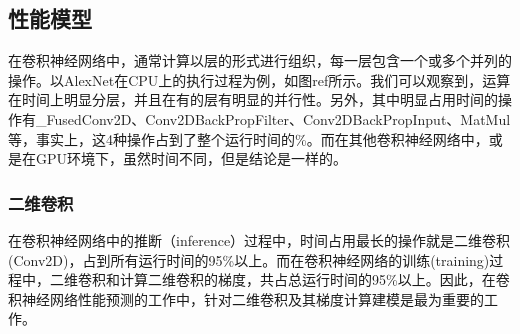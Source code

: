 \subsection{性能模型}
    在卷积神经网络中，通常计算以层的形式进行组织，每一层包含一个或多个并列的操作。以AlexNet在CPU上的执行过程为例，如图ref所示。我们可以观察到，运算在时间上明显分层，并且在有的层有明显的并行性。另外，其中明显占用时间的操作有\_FusedConv2D、Conv2DBackPropFilter、Conv2DBackPropInput、MatMul等，事实上，这4种操作占到了整个运行时间的\%。而在其他卷积神经网络中，或是在GPU环境下，虽然时间不同，但是结论是一样的。

\subsubsection{二维卷积}
    在卷积神经网络中的推断（inference）过程中，时间占用最长的操作就是二维卷积(Conv2D)，占到所有运行时间的95\%以上。而在卷积神经网络的训练(training)过程中，二维卷积和计算二维卷积的梯度，共占总运行时间的95\%以上。因此，在卷积神经网络性能预测的工作中，针对二维卷积及其梯度计算建模是最为重要的工作。
